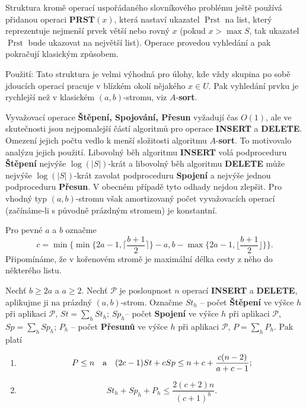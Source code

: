 \documentclass[a4paper,12pt]{article}
\def \emph#1{\underbar{#1}}
\DeclareMathOperator*{\Prst}{Prst}
\begin{document}
Struktura kromě operací uspořádaného 
slovníkového prob\-lé\-mu 
ještě používá přidanou ope\-raci {\bf PRST$(x)$}, která nastaví ukazatel 
$\Prst$ na list, který reprezentuje nejmenší prvek větší 
nebo rovný $x$ (pokud $x>\max S$, tak ukazatel $\Prst$ bude 
ukazovat na největší list). Operace provedou vyhledání a 
pak pokračují klasickým způsobem.

Použití: Tato struktura je velmi výhodná pro 
úlohy, kde vždy skupina po sobě jdoucích ope\-rací  
pracuje v blízkém okolí něja\-ké\-ho $x\in U$. Pak 
vyhledání prvku je rychlejší než v klasickém 
$(a,b)$-stromu, viz $A$-{\bf sort}.

Vyvažovací operace {\bf Štěpení, Spojování, Přesun }
vyžadují čas $O(1)$, ale ve skutečnosti jsou nejpomalejší 
částí 
algoritmů pro operace {\bf INSERT} a {\bf DELETE}.  Omezení 
jejich počtu vedlo k menší složitosti algoritmu $A$-{\bf sort}.  To motivovalo analýzu 
jejich použití.\newline 
Libovolný běh algoritmu {\bf INSERT }
volá podproceduru {\bf Štěpe\-ní} nejvýše $\log(|
S|)$-krát a libovolný běh 
algoritmu  {\bf DELETE} mů\-že nejvýše $\log(|S|
)$-krát zavolat podproceduru 
{\bf Spojení }
a nejvýše jednou podproceduru {\bf Přesun}.  V obecném 
případě tyto od\-ha\-dy nejdou zlepšit.  Pro vhodný typ 
$(a,b)$-stromu však amortizovaný počet vyvažovacích 
ope\-rací (začínáme-li s  
pů\-vod\-ně práz\-dným stromem) je konstantní.

Pro pevné $a$ a $b$ označme 
$$c=\min\{\min\{2a-1,\lceil\frac {b+1}2\rceil \}-a,b-\max\{2a-1,\lfloor\frac {
b+1}2\rfloor \}\}.$$
Připomínáme, že \emph{výška} \emph{vrcholu} v kořenovém stromě je 
maximální délka cesty z něho do některého listu.

\begin{veta}Nechť $b\ge 2a$ a $a\ge 2$. Nechť $\mathcal P$ je 
posloupnost $n$ operací {\bf INSERT} a {\bf DELETE}, aplikujme ji na 
prázdný $(a,b)$-strom. Označme\newline 
$St_h$ -- počet {\bf Štěpení} ve výšce $h$ při aplikaci $
\mathcal P$, $St=\sum_hSt_h$;\newline 
$Sp_h$-- počet {\bf Spojení} ve výšce $h$ při aplikaci $
\mathcal P$, 
$Sp=\sum_hSp_h$;\newline 
$P_h$ -- počet {\bf Přesunů} ve výšce $h$ při aplikaci $
\mathcal P$, 
$P=\sum_hP_h$.\newline 
Pak platí
\begin{enumerate}
\item
$$P\le n\quad \text{\rm a}\quad (2c-1)St+cSp\le n+c+\frac {c(n-2)}{a+c-1};$$
\item
$$St_h+Sp_h+P_h\le\frac {2(c+2)n}{(c+1)^h}.$$
\end{enumerate}
\end{veta}
\end{document}
